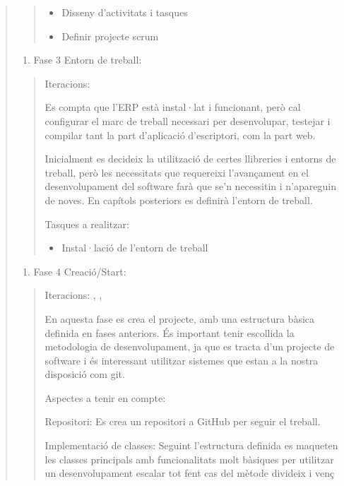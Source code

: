 \documentclass[letterpaper,11pt,catalan]{sphinxmanual}
\begin{document}
\begin{quote}
\begin{quote}
\begin{itemize}
\item {} 
Disseny d'activitats i tasques

\item {} 
Definir projecte scrum

\end{itemize}
\end{quote}
\begin{enumerate}
\item {} 
Fase 3 Entorn de treball:

\end{enumerate}
\begin{quote}

Iteracions: 

Es compta que l'ERP està instal·lat i funcionant, però cal configurar el marc de treball necessari
per desenvolupar, testejar i compilar tant la part d'aplicació d'escriptori, com la part web.

Inicialment es decideix la utilització de certes llibreries i entorns de treball, però les necessitats
que requereixi l'avançament en el desenvolupament del software farà que se'n necessitin i n'apareguin
de noves. En capítols posteriors es definirà l'entorn de treball.

Tasques a realitzar:
\begin{itemize}
\item {} 
Instal·lació de l'entorn de treball

\end{itemize}
\end{quote}
\begin{enumerate}
\item {} 
Fase 4 Creació/Start:

\end{enumerate}
\begin{quote}

Iteracions: , , 

En aquesta fase es crea el projecte, amb una estructura bàsica definida en fases
anteriors. És important tenir escollida la metodologia de desenvolupament, ja que
es tracta d'un projecte de software i és interessant utilitzar sistemes que
estan a la nostra disposició com git.

Aspectes a tenir en compte:

Repositori: Es crea un repositori a GitHub per seguir el treball.

Implementació de classes: Seguint l'estructura definida es maqueten les classes
principals amb funcionalitats molt bàsiques per utilitzar un desenvolupament
escalar tot fent cas del mètode \sphinxquotedblleft{}divideix i venç\sphinxquotedblright{}


\end{quote}
\end{quote}
\end{document}
